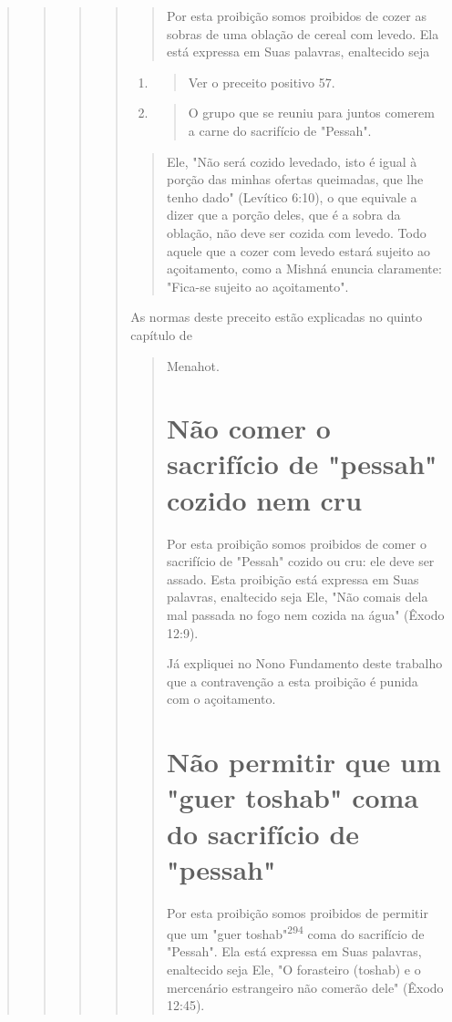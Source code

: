 \begin{quote}
\begin{quote}
\begin{quote}
\begin{quote}
\begin{quote}
Por esta proibição somos proibidos de cozer as sobras de uma obla­ção de
cereal com levedo. Ela está expressa em Suas palavras, enaltecido seja
\end{quote}

\begin{enumerate}
\def\labelenumi{\arabic{enumi}.}
\setcounter{enumi}{291}
\item
 \begin{quote}
 Ver o preceito positivo 57.
 \end{quote}
\item
 \begin{quote}
 O grupo que se reuniu para juntos comerem a carne do sacrifício de
 "Pessah".
 \end{quote}
\end{enumerate}

\begin{quote}
Ele, "Não será cozido levedado, isto é igual à porção das minhas ofertas
quei­madas, que lhe tenho dado" (Levítico 6:10), o que equivale a dizer
que a por­ção deles, que é a sobra da oblação, não deve ser cozida com
levedo. Todo aquele que a cozer com levedo estará sujeito ao
açoitamento, como a Mishná enuncia claramente: "Fica-se sujeito ao
açoitamento".
\end{quote}

As normas deste preceito estão explicadas no quinto capítulo de

\begin{quote}
Menahot.

\section{Não comer o sacrifício de "pessah" cozido nem cru}

Por esta proibição somos proibidos de comer o sacrifício de "Pes­sah"
cozido ou cru: ele deve ser assado. Esta proibição está expressa em Suas
palavras, enaltecido seja Ele, "Não comais dela mal passada no fogo nem
cozi­da na água" (Êxodo 12:9).

Já expliquei no Nono Fundamento deste trabalho que a contraven­ção a
esta proibição é punida com o açoitamento.

\section{Não permitir que um "guer toshab" coma do sacrifício de "pessah"}

Por esta proibição somos proibidos de permitir que um "guer
tos­hab"\textsuperscript{294} coma do sacrifício de "Pessah". Ela está
expressa em Suas palavras, enaltecido seja Ele, "O forasteiro (toshab) e
o mercenário estrangeiro não co­merão dele" (Êxodo 12:45).


\end{quote}
\end{quote}
\end{quote}
\end{quote}
\end{quote}
